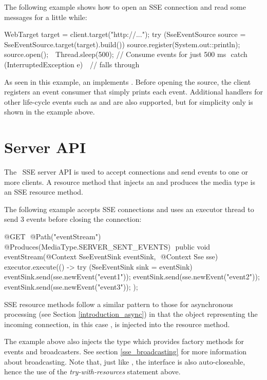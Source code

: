 The following example shows how to open an SSE connection and read some messages for a little
while:

\begin{listing}{1}
  WebTarget target = client.target("http://...");
  try (SseEventSource source = SseEventSource.target(target).build()) {
	source.register(System.out::println);
	source.open();  
	Thread.sleep(500); 		// Consume events for just 500 ms 
  } catch (InterruptedException e) { 
	// falls through 
  }
\end{listing}

As seen in this example, an  implements . Before opening the source, the client registers an event consumer that simply prints each event. Additional handlers for other life-cycle events such as  and  are also supported, but for simplicity only  is shown in the example above.

\section{Server API}
\label{sse_server_api}

The \jaxrs\ SSE server API is used to accept connections and send events to one or more clients. A resource method that injects an  and produces the media type  is an SSE resource method.

The following example accepts SSE connections and uses an executor thread to send 3 events before closing the connection:

\begin{listing}{1}
@GET 
@Path("eventStream") 
@Produces(MediaType.SERVER_SENT_EVENTS) 
public void eventStream(@Context SseEventSink eventSink, 
                        @Context Sse sse) {
  executor.execute(() -> {
    try (SseEventSink sink = eventSink) {  
      eventSink.send(sse.newEvent("event1"));
      eventSink.send(sse.newEvent("event2"));
      eventSink.send(sse.newEvent("event3"));
	} 
  });
}
\end{listing}

SSE resource methods follow a similar pattern to those for asynchronous processing (see Section \ref{introduction_async}) in that the object representing the incoming connection, in this case , is injected into the resource method. 

The example above also injects the  type which provides factory methods for events and broadcasters. See section \ref{sse_broadcasting} for more information about broadcasting. Note that, just like , the interface  is also auto-closeable, hence the use of the \emph{try-with-resources} statement above.

